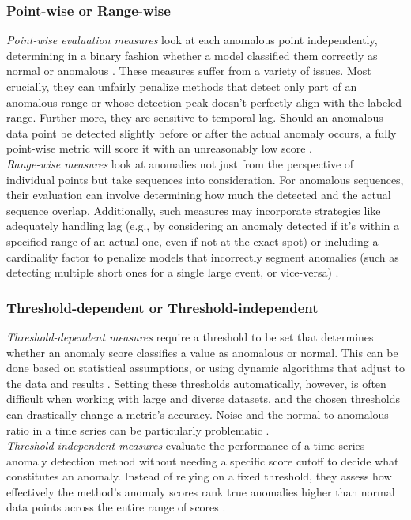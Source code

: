 \documentclass[12pt,oneside]{article}
\begin{document}
\subsubsection{Point-wise or Range-wise}
\textit{Point-wise evaluation measures} look at each anomalous point independently, determining in a binary fashion whether a model classified them correctly as normal or anomalous \parencite[p.~7]{liu2024elephant}. These measures suffer from a variety of issues. Most crucially, they can unfairly penalize methods that detect only part of an anomalous range or whose detection peak doesn't perfectly align with the labeled range. Further more, they are sensitive to temporal lag. Should an anomalous data point be detected slightly before or after the actual anomaly occurs, a fully point-wise metric will score it with an unreasonably low score \parencites[p.~2778]{papaVus}.\\ \textit{Range-wise measures} look at anomalies not just from the perspective of individual points but take sequences into consideration. For anomalous sequences, their evaluation can involve determining how much the detected and the actual sequence overlap. Additionally, such measures may incorporate strategies like adequately handling lag (e.g., by considering an anomaly detected if it's within a specified range of an actual one, even if not at the exact spot) or including a cardinality factor to penalize models that incorrectly segment anomalies (such as detecting multiple short ones for a single large event, or vice-versa) \parencite[p.~7]{liu2024elephant}.
\subsubsection{Threshold-dependent or Threshold-independent}
\textit{Threshold-dependent measures} require a threshold to be set that determines whether an anomaly score classifies a value as anomalous or normal. This can be done based on statistical assumptions, or using dynamic algorithms that adjust to the data and results \parencites[p.~38-39]{boniol2024divetimeseriesanomalydetection}. Setting these thresholds automatically, however, is often difficult when working with large and diverse datasets, and the chosen thresholds can drastically change a metric's accuracy. Noise and the normal-to-anomalous ratio in a time series can be particularly problematic \parencites[p.~2777-2778]{papaVus}. \\
\textit{Threshold-independent measures} evaluate the performance of a time series anomaly detection method without needing a specific score cutoff to decide what constitutes an anomaly. Instead of relying on a fixed threshold, they assess how effectively the method's anomaly scores rank true anomalies higher than normal data points across the entire range of scores \parencites[p.~39-41]{boniol2024divetimeseriesanomalydetection}.
\end{document}
